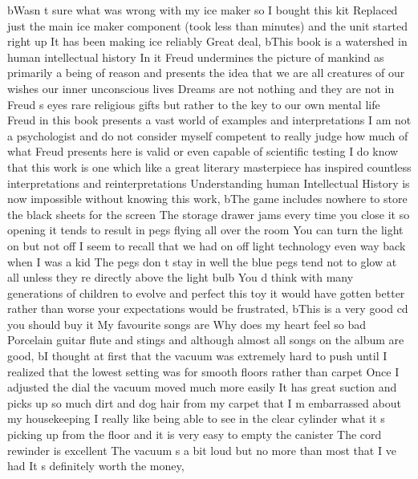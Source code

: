 \documentclass[
]{article}
\newenvironment{Shaded}{}{}
\newcommand{\NormalTok}[1]{#1}
\newcommand{\StringTok}[1]{\textcolor[rgb]{0.25,0.44,0.63}{#1}}
\begin{document}
\begin{Shaded}
\begin{Highlighting}[]
\NormalTok{       b}\StringTok{\textquotesingle{}Wasn t sure what was wrong with my ice maker so I bought this kit Replaced just the main ice maker component (took less than minutes) and the unit started right up It has been making ice reliably Great deal\textquotesingle{}}\NormalTok{,}
\NormalTok{       b}\StringTok{\textquotesingle{}This book is a watershed in human intellectual history In it Freud undermines the picture of mankind as primarily a being of reason and presents the idea that we are all creatures of our wishes our inner unconscious lives Dreams are not nothing and they are not in Freud s eyes rare religious gifts but rather to the key to our own mental life Freud in this book presents a vast world of examples and interpretations I am not a psychologist and do not consider myself competent to really judge how much of what Freud presents here is valid or even capable of scientific testing I do know that this work is one which like a great literary masterpiece has inspired countless interpretations and reinterpretations Understanding human Intellectual History is now impossible without knowing this work\textquotesingle{}}\NormalTok{,}
\NormalTok{       b}\StringTok{\textquotesingle{}The game includes nowhere to store the black sheets for the screen The storage drawer jams every time you close it so opening it tends to result in pegs flying all over the room You can turn the light on but not off I seem to recall that we had on off light technology even way back when I was a kid The pegs don t stay in well the blue pegs tend not to glow at all unless they re directly above the light bulb You d think with many generations of children to evolve and perfect this toy it would have gotten better rather than worse your expectations would be frustrated\textquotesingle{}}\NormalTok{,}
\NormalTok{       b}\StringTok{\textquotesingle{}This is a very good cd you should buy it My favourite songs are Why does my heart feel so bad Porcelain guitar flute and stings and although almost all songs on the album are good\textquotesingle{}}\NormalTok{,}
\NormalTok{       b}\StringTok{\textquotesingle{}I thought at first that the vacuum was extremely hard to push until I realized that the lowest setting was for smooth floors rather than carpet Once I adjusted the dial the vacuum moved much more easily It has great suction and picks up so much dirt and dog hair from my carpet that I m embarrassed about my housekeeping I really like being able to see in the clear cylinder what it s picking up from the floor and it is very easy to empty the canister The cord rewinder is excellent The vacuum s a bit loud but no more than most that I ve had It s definitely worth the money\textquotesingle{}}\NormalTok{,}

\end{Highlighting}
\end{Shaded}
\end{document}
